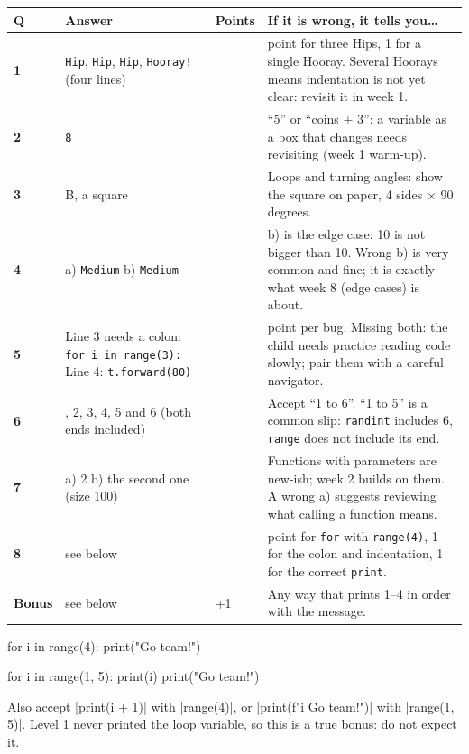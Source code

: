 {\small
\begin{longtable}{@{}>{\bfseries}p{1.3cm}>{\raggedright\arraybackslash}p{4.9cm}>{\raggedright\arraybackslash}p{1.2cm}>{\raggedright\arraybackslash}p{7.0cm}@{}}
\toprule
Q & Answer & Points & If it is wrong, it tells you\ldots \\ \midrule\endhead
1 & \texttt{Hip}, \texttt{Hip}, \texttt{Hip}, \texttt{Hooray!} (four lines) & 2 & 1 point for three Hips, 1 for a single Hooray. Several Hoorays means indentation is not yet clear: revisit it in week 1. \\
2 & \texttt{8} & 1 & \enquote{5} or \enquote{coins + 3}: a variable as a box that changes needs revisiting (week 1 warm-up). \\
3 & B, a square & 1 & Loops and turning angles: show the square on paper, 4 sides $\times$ 90 degrees. \\
4 & a) \texttt{Medium} \quad b) \texttt{Medium} & 2 & b) is the edge case: 10 is not bigger than 10. Wrong b) is very common and fine; it is exactly what week 8 (edge cases) is about. \\
5 & Line 3 needs a colon: \texttt{for i in range(3):} \quad Line 4: \texttt{t.forward(80)} & 2 & 1 point per bug. Missing both: the child needs practice reading code slowly; pair them with a careful navigator. \\
6 & 1, 2, 3, 4, 5 and 6 (both ends included) & 1 & Accept \enquote{1 to 6}. \enquote{1 to 5} is a common slip: \texttt{randint} includes 6, \texttt{range} does not include its end. \\
7 & a) 2 \quad b) the second one (size 100) & 2 & Functions with parameters are new-ish; week 2 builds on them. A wrong a) suggests reviewing what calling a function means. \\
8 & see below & 3 & 1 point for \texttt{for} with \texttt{range(4)}, 1 for the colon and indentation, 1 for the correct \texttt{print}. \\
Bonus & see below & +1 & Any way that prints 1--4 in order with the message. \\
\bottomrule
\end{longtable}}

\begin{answer}
\begin{pycode}[Question 8]
for i in range(4):
    print("Go team!")
\end{pycode}
\begin{pycode}[Bonus]
for i in range(1, 5):
    print(i)
    print("Go team!")
\end{pycode}
Also accept \py|print(i + 1)| with \py|range(4)|, or \py|print(f"{i} Go team!")| with \py|range(1, 5)|.
Level 1 never printed the loop variable, so this is a true bonus: do not expect it.
\end{answer}

